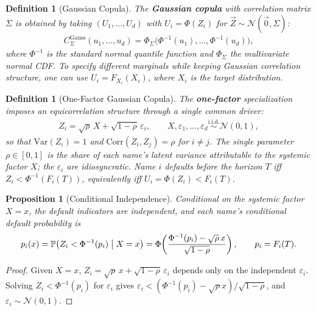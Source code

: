 \documentclass{report}
\theoremstyle{spacedplain}
\newtheorem{proposition}[theorem]{Proposition}
\theoremstyle{spaceddefinition}
\newtheorem{definition}[theorem]{Definition}
\theoremstyle{spacedremark}
\begin{document}
\begin{definition}[Gaussian Copula]
The \textbf{Gaussian copula} with correlation matrix $\Sigma$ is obtained by taking $(U_1,\dots,U_d)$ with $U_i = \Phi(Z_i)$ for $\vec{Z} \sim \mathcal{N}(\vec 0, \Sigma)$:
\begin{align}
    C_\Sigma^{\text{Gauss}}(u_1, \ldots, u_d) = \Phi_\Sigma\bigl(\Phi^{-1}(u_1), \ldots, \Phi^{-1}(u_d)\bigr),
\end{align}
where $\Phi^{-1}$ is the standard normal quantile function and $\Phi_\Sigma$ the multivariate normal CDF. To specify different marginals while keeping Gaussian correlation structure, one can use $U_i = F_{X_i}(X_i)$, where $X_i$ is the target distribution.
\end{definition}

\begin{definition}[One-Factor Gaussian Copula]
The \textbf{one-factor} specialization imposes an equicorrelation structure through a single common driver:
\begin{align}
    Z_i = \sqrt{\rho}\,X + \sqrt{1-\rho}\,\varepsilon_i, \qquad X, \varepsilon_1, \ldots, \varepsilon_d \overset{\text{i.i.d.}}{\sim} \mathcal{N}(0,1),
\end{align}
so that $\mathrm{Var}(Z_i) = 1$ and $\mathrm{Corr}(Z_i, Z_j) = \rho$ for $i \neq j$. The single parameter $\rho \in [0,1]$ is the share of each name's latent variance attributable to the systemic factor $X$; the $\varepsilon_i$ are idiosyncratic. Name $i$ defaults before the horizon $T$ iff $Z_i < \Phi^{-1}(F_i(T))$, equivalently iff $U_i = \Phi(Z_i) < F_i(T)$.
\end{definition}

\begin{proposition}[Conditional Independence]\label{prop:cond-indep}
Conditional on the systemic factor $X = x$, the default indicators are independent, and each name's conditional default probability is
\begin{align}
    p_i(x) = \mathbb{P}\bigl(Z_i < \Phi^{-1}(p_i) \bigm| X = x\bigr) = \Phi\!\left(\frac{\Phi^{-1}(p_i) - \sqrt{\rho}\,x}{\sqrt{1-\rho}}\right), \qquad p_i = F_i(T).
\end{align}
\end{proposition}
\begin{proof}
Given $X = x$, $Z_i = \sqrt{\rho}\,x + \sqrt{1-\rho}\,\varepsilon_i$ depends only on the independent $\varepsilon_i$. Solving $Z_i < \Phi^{-1}(p_i)$ for $\varepsilon_i$ gives $\varepsilon_i < (\Phi^{-1}(p_i) - \sqrt{\rho}x)/\sqrt{1-\rho}$, and $\varepsilon_i \sim \mathcal{N}(0,1)$.
\end{proof}
\end{document}
